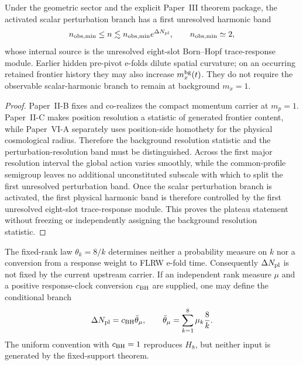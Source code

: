 \documentclass[12pt,a4paper]{article}
\begin{document}
\begin{proposition}
\label{p8:prop:bh-plateau}
Under the geometric sector and the explicit Paper~III theorem package, the activated scalar perturbation branch has a first unresolved harmonic band
\begin{equation}
\label{p8:eq:first-harmonic-band-general}
n_{\rm obs,min}\le n\lesssim n_{\rm obs,min}e^{\Delta N_{\rm pl}},
\qquad n_{\rm obs,min}\simeq2,
\end{equation}
whose internal source is the unresolved eight-slot Born--Hopf trace-response
module.  Earlier hidden pre-pivot e-folds dilute spatial curvature; on an
occurring retained frontier history they may also increase
\(m_x^{\rm bg}(t)\).  They do not require the observable scalar-harmonic
branch to remain at background \(m_x=1\).
\end{proposition}

\begin{proof}
Paper~II-B fixes and co-realizes the compact momentum carrier at
\(m_p=1\).  Paper~II-C makes position resolution a statistic of generated
frontier content, while Paper~VI-A separately uses position-side homothety for
the physical cosmological radius.  Therefore the background resolution
statistic and the perturbation-resolution band must be distinguished.  Across
the first major resolution interval the global action varies smoothly, while
the common-profile semigroup leaves no additional unconstituted subscale with
which to split the first unresolved perturbation band.  Once the scalar
perturbation branch is activated, the first physical harmonic band is
therefore controlled by the first unresolved eight-slot trace-response module.
This proves the plateau statement without freezing or independently assigning
the background resolution statistic.
\end{proof}

\begin{corollary}
\label{p8:cor:bh-duration}
The fixed-rank law \(\theta_k=8/k\) determines neither a probability measure
on \(k\) nor a conversion from a response weight to FLRW e-fold time.
Consequently \(\Delta N_{\rm pl}\) is not fixed by the current upstream
carrier.  If an independent rank measure \(\mu\) and a positive response-clock
conversion \(c_{\rm BH}\) are supplied, one may define the conditional branch
\begin{equation}
\label{p8:eq:bh-DeltaN}
 \Delta N_{\rm pl}=c_{\rm BH}\bar\theta_\mu,
 \qquad
 \bar\theta_\mu=\sum_{k=1}^8\mu_k\frac8k.
\end{equation}
The uniform convention with \(c_{\rm BH}=1\) reproduces \(H_8\), but neither
input is generated by the fixed-support theorem.
\end{corollary}
\end{document}
